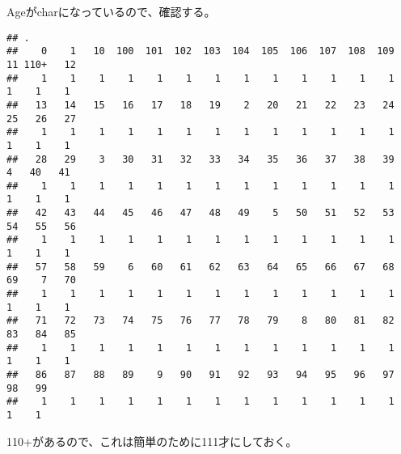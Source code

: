 \documentclass[
]{book}
\newenvironment{Shaded}{\begin{snugshade}}{\end{snugshade}}
\newcommand{\DataTypeTok}[1]{\textcolor[rgb]{0.13,0.29,0.53}{#1}}
\newcommand{\KeywordTok}[1]{\textcolor[rgb]{0.13,0.29,0.53}{\textbf{#1}}}
\newcommand{\NormalTok}[1]{#1}
\newcommand{\OperatorTok}[1]{\textcolor[rgb]{0.81,0.36,0.00}{\textbf{#1}}}
\newcommand{\StringTok}[1]{\textcolor[rgb]{0.31,0.60,0.02}{#1}}
\begin{document}
Ageがcharになっているので、確認する。

\begin{Shaded}
\end{Shaded}

\begin{verbatim}
## .
##    0    1   10  100  101  102  103  104  105  106  107  108  109   11 110+   12 
##    1    1    1    1    1    1    1    1    1    1    1    1    1    1    1    1 
##   13   14   15   16   17   18   19    2   20   21   22   23   24   25   26   27 
##    1    1    1    1    1    1    1    1    1    1    1    1    1    1    1    1 
##   28   29    3   30   31   32   33   34   35   36   37   38   39    4   40   41 
##    1    1    1    1    1    1    1    1    1    1    1    1    1    1    1    1 
##   42   43   44   45   46   47   48   49    5   50   51   52   53   54   55   56 
##    1    1    1    1    1    1    1    1    1    1    1    1    1    1    1    1 
##   57   58   59    6   60   61   62   63   64   65   66   67   68   69    7   70 
##    1    1    1    1    1    1    1    1    1    1    1    1    1    1    1    1 
##   71   72   73   74   75   76   77   78   79    8   80   81   82   83   84   85 
##    1    1    1    1    1    1    1    1    1    1    1    1    1    1    1    1 
##   86   87   88   89    9   90   91   92   93   94   95   96   97   98   99 
##    1    1    1    1    1    1    1    1    1    1    1    1    1    1    1
\end{verbatim}

110+があるので、これは簡単のために111才にしておく。

\begin{Shaded}
\end{Shaded}
\end{document}
